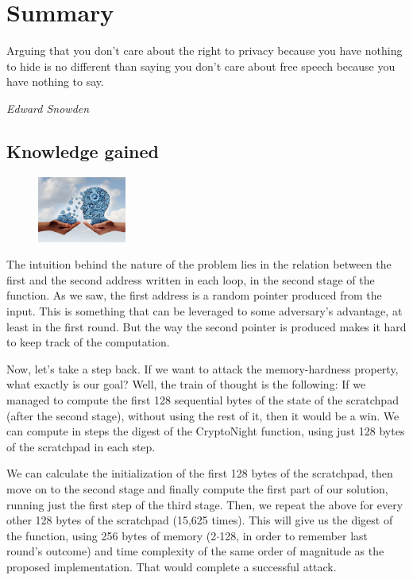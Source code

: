 \chapter{Summary}
%
\epigraph{Arguing that you don't care about the right to privacy because you have nothing to hide is no different than saying you don't care about free speech because you have nothing to say.}{\textit{Edward Snowden}}
%
\section{Knowledge gained}
\begin{figure}
\centering
\includegraphics[width=0.26\textwidth]{Images/Summary/knowledge.jpg}
\end{figure}
The intuition behind the nature of the problem lies in the relation between the first and the second address written in each loop, in the second stage of the function. As we saw, the first address is a random pointer produced from the input. This is something that can be leveraged to some adversary's advantage, at least in the first round. But the way the second pointer is produced makes it hard to keep track of the computation.

Now, let's take a step back. If we want to attack the memory-hardness property, what exactly is our goal? Well, the train of thought is the following: If we managed to compute the first 128 sequential bytes of the state of the scratchpad (after the second stage), without using the rest of it, then it would be a win. We can compute in steps the digest of the CryptoNight function, using just 128 bytes of the scratchpad in each step.

We can calculate the initialization of the first 128 bytes of the scratchpad, then move on to the second stage and finally compute the first part of our solution, running just the first step of the third stage. Then, we repeat the above for every other 128 bytes of the scratchpad (15,625 times). This will give us the digest of the function, using 256 bytes of memory (2$\cdot$128, in order to remember last round's outcome) and time complexity of the same order of magnitude as the proposed implementation. That would complete a successful attack.
\pagebreak

